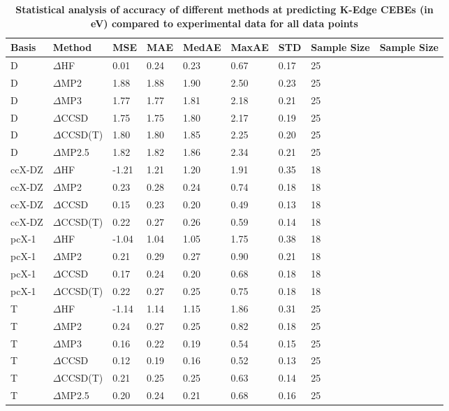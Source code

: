 \begin{table}
  \caption{\textbf{Statistical analysis of accuracy of different methods at predicting K-Edge CEBEs (in eV) compared to experimental data for all data points}}
  \label{tbl:method-all-summary}
  \begin{tabular}{l l l l l l l l l }
    \hline
    \textbf{Basis} & \textbf{Method} & \textbf{MSE} & \textbf{MAE} & \textbf{MedAE} & \textbf{MaxAE} & \textbf{STD} & \textbf{Sample Size} & \textbf{Sample Size} \\ 
    \hline
    D & $\Delta$HF & 0.01 & 0.24 & 0.23 & 0.67 & 0.17 & 25 \\ 
    D & $\Delta$MP2 & 1.88 & 1.88 & 1.90 & 2.50 & 0.23 & 25 \\ 
    D & $\Delta$MP3 & 1.77 & 1.77 & 1.81 & 2.18 & 0.21 & 25 \\ 
    D & $\Delta$CCSD & 1.75 & 1.75 & 1.80 & 2.17 & 0.19 & 25 \\ 
    D & $\Delta$CCSD(T) & 1.80 & 1.80 & 1.85 & 2.25 & 0.20 & 25 \\ 
    D & $\Delta$MP2.5 & 1.82 & 1.82 & 1.86 & 2.34 & 0.21 & 25 \\ 
    ccX-DZ & $\Delta$HF & -1.21 & 1.21 & 1.20 & 1.91 & 0.35 & 18 \\ 
    ccX-DZ & $\Delta$MP2 & 0.23 & 0.28 & 0.24 & 0.74 & 0.18 & 18 \\ 
    ccX-DZ & $\Delta$CCSD & 0.15 & 0.23 & 0.20 & 0.49 & 0.13 & 18 \\ 
    ccX-DZ & $\Delta$CCSD(T) & 0.22 & 0.27 & 0.26 & 0.59 & 0.14 & 18 \\ 
    pcX-1 & $\Delta$HF & -1.04 & 1.04 & 1.05 & 1.75 & 0.38 & 18 \\ 
    pcX-1 & $\Delta$MP2 & 0.21 & 0.29 & 0.27 & 0.90 & 0.21 & 18 \\ 
    pcX-1 & $\Delta$CCSD & 0.17 & 0.24 & 0.20 & 0.68 & 0.18 & 18 \\ 
    pcX-1 & $\Delta$CCSD(T) & 0.22 & 0.27 & 0.25 & 0.75 & 0.18 & 18 \\ 
    T & $\Delta$HF & -1.14 & 1.14 & 1.15 & 1.86 & 0.31 & 25 \\ 
    T & $\Delta$MP2 & 0.24 & 0.27 & 0.25 & 0.82 & 0.18 & 25 \\ 
    T & $\Delta$MP3 & 0.16 & 0.22 & 0.19 & 0.54 & 0.15 & 25 \\ 
    T & $\Delta$CCSD & 0.12 & 0.19 & 0.16 & 0.52 & 0.13 & 25 \\ 
    T & $\Delta$CCSD(T) & 0.21 & 0.25 & 0.25 & 0.63 & 0.14 & 25 \\ 
    T & $\Delta$MP2.5 & 0.20 & 0.24 & 0.21 & 0.68 & 0.16 & 25 \\ 

\end{tabular}
\end{table}
